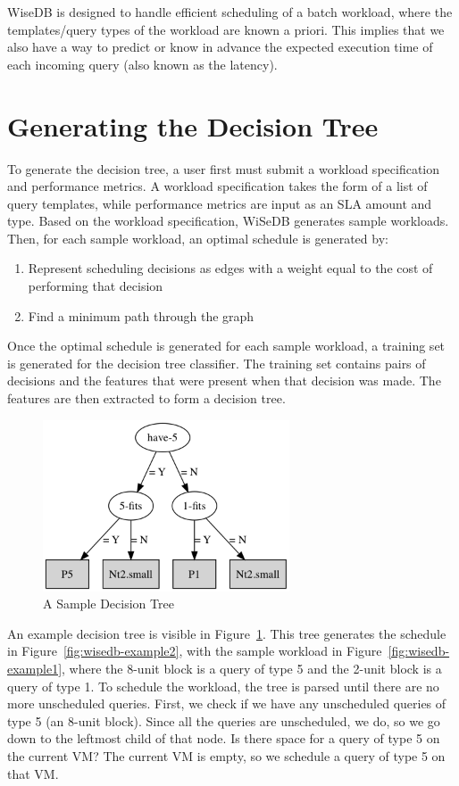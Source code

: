 \documentclass{brandiss}
\numberwithin{section}{chapter}
\numberwithin{figure}{chapter}
\theoremstyle{definition}
\theoremstyle{plain}
\theoremstyle{remark}
\begin{document}
WiseDB is designed to handle efficient scheduling of a batch workload, where the templates/query types of the workload are known a priori. This implies that we also have a way to predict or know in advance the expected execution time of each incoming query (also known as the latency).

\section{Generating the Decision Tree}

To generate the decision tree, a user first must submit a workload specification and performance metrics. A workload specification takes the form of a list of query templates, while performance metrics  are input as an SLA amount and type. Based on the workload specification, WiSeDB generates sample workloads. Then, for each sample workload, an optimal schedule is generated by:

\begin{enumerate}
\item Represent scheduling decisions as edges with a weight equal to the cost of performing that decision
\item Find a minimum path through the graph

\end{enumerate}

Once the optimal schedule is generated for each sample workload, a training set is generated for the decision tree classifier. The training set contains pairs of decisions and the features that were present when that decision was made. The features are then extracted to form a decision tree.

\begin{figure}[htbp]
  \centering
  \includegraphics[height=2in]{dt1}
  \caption{A Sample Decision Tree}
  \label{fig:dt1}
\end{figure}

An example decision tree is visible in Figure~\ref{fig:dt1}. This tree generates the schedule in Figure~\ref{fig:wisedb-example2}, with the sample workload in Figure~\ref{fig:wisedb-example1}, where the 8-unit block is a query of type 5 and the 2-unit block is a query of type 1. To schedule the workload, the tree is parsed until there are no more unscheduled queries. First, we check if we have any unscheduled queries of type 5 (an 8-unit block). Since all the queries are unscheduled, we do, so we go down to the leftmost child of that node. Is there space for a query of type 5 on the current VM? The current VM is empty, so we schedule a query of type 5 on that VM.
\end{document}
